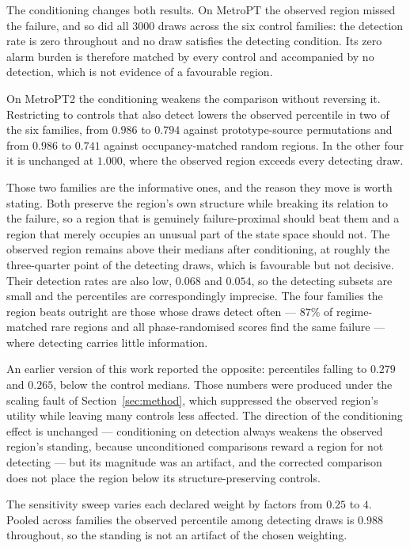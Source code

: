 The conditioning changes both results. On MetroPT the observed region missed the failure, and so did all 3000 draws across the six control families: the detection rate is zero throughout and no draw satisfies the detecting condition. Its zero alarm burden is therefore matched by every control and accompanied by no detection, which is not evidence of a favourable region.

On MetroPT2 the conditioning weakens the comparison without reversing it. Restricting to controls that also detect lowers the observed percentile in two of the six families, from \(0.986\) to \(0.794\) against prototype-source permutations and from \(0.986\) to \(0.741\) against occupancy-matched random regions. In the other four it is unchanged at \(1.000\), where the observed region exceeds every detecting draw.

Those two families are the informative ones, and the reason they move is worth stating. Both preserve the region's own structure while breaking its relation to the failure, so a region that is genuinely failure-proximal should beat them and a region that merely occupies an unusual part of the state space should not. The observed region remains above their medians after conditioning, at roughly the three-quarter point of the detecting draws, which is favourable but not decisive. Their detection rates are also low, \(0.068\) and \(0.054\), so the detecting subsets are small and the percentiles are correspondingly imprecise. The four families the region beats outright are those whose draws detect often --- \(87\%\) of regime-matched rare regions and all phase-randomised scores find the same failure --- where detecting carries little information.

An earlier version of this work reported the opposite: percentiles falling to \(0.279\) and \(0.265\), below the control medians. Those numbers were produced under the scaling fault of Section~\ref{sec:method}, which suppressed the observed region's utility while leaving many controls less affected. The direction of the conditioning effect is unchanged --- conditioning on detection always weakens the observed region's standing, because unconditioned comparisons reward a region for not detecting --- but its magnitude was an artifact, and the corrected comparison does not place the region below its structure-preserving controls.

The sensitivity sweep varies each declared weight by factors from \(0.25\) to \(4\). Pooled across families the observed percentile among detecting draws is \(0.988\) throughout, so the standing is not an artifact of the chosen weighting.


